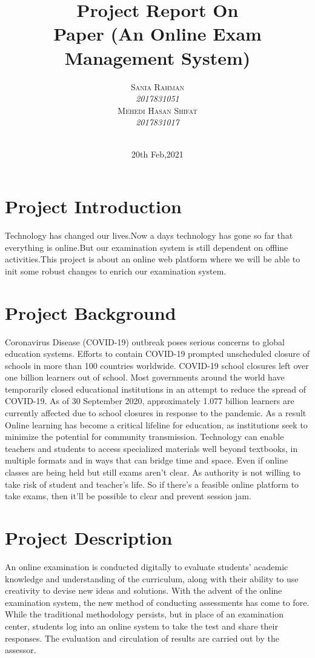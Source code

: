 \documentclass[10pt]{article}
\title{ 
  Project Report On \\  Paper (An Online Exam Management System)
}
\author{
    \textsc{Sania Rahman}\\
    \small\emph{2017831051}\\

    \textsc{Mehedi Hasan Shifat}\\
    \small\emph{2017831017}\\\\
}
\date{20th Feb,2021}
\begin{document}
\maketitle

\pagebreak

\tableofcontents
\pagebreak

\section{Project Introduction}

Technology has changed our lives.Now a days technology has gone so far that everything is online.But our examination system is still dependent on offline activities.This project is about an online web platform where we will be able to init some robust changes to enrich our examination system.


\section{Project Background}

Coronavirus Disease (COVID-19) outbreak poses serious concerns to global education
systems. Efforts to contain COVID-19 prompted unscheduled closure of schools in more
than 100 countries worldwide. COVID-19 school closures left over one billion learners
out of school.
Most governments around the world have temporarily closed educational institutions in an attempt to reduce the spread of COVID-19. As of 30 September 2020,
approximately 1.077 billion learners are currently affected due to school closures in
response to the pandemic.
As a result Online learning has become a critical lifeline for education, as institutions
seek to minimize the potential for community transmission. Technology can enable
teachers and students to access specialized materials well beyond textbooks, in multiple
formats and in ways that can bridge time and space.
Even if online classes are being held but still exams aren’t clear. As authority is not
willing to take risk of student and teacher’s life. So if there’s a feasible online platform
to take exams, then it’ll be possible to clear and prevent session jam.

\section{Project Description}

An online examination is conducted digitally to evaluate students’ academic knowledge and understanding of the curriculum, along with their ability to use creativity to devise new ideas and solutions.
With the advent of the online examination system, the new method of conducting assessments has come to fore. While the traditional methodology persists, but in place of an examination center, students log into an online system to take the test and share their responses. The evaluation and circulation of results are carried out by the assessor.
\end{document}
